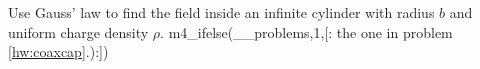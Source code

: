         Use Gauss' law to find the field inside an
        infinite cylinder with radius $b$ and uniform
        charge density $\rho$. 
m4_ifelse(__problems,1,[:%
        the one in problem \ref{hw:coaxcap}.):])%
\answercheck
